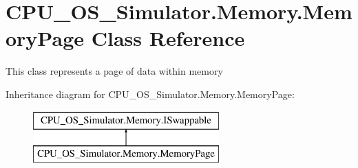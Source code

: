 \hypertarget{class_c_p_u___o_s___simulator_1_1_memory_1_1_memory_page}{}\section{C\+P\+U\+\_\+\+O\+S\+\_\+\+Simulator.\+Memory.\+Memory\+Page Class Reference}
\label{class_c_p_u___o_s___simulator_1_1_memory_1_1_memory_page}


This class represents a page of data within memory  


Inheritance diagram for C\+P\+U\+\_\+\+O\+S\+\_\+\+Simulator.\+Memory.\+Memory\+Page\+:\begin{figure}[H]
\begin{center}
\leavevmode
\includegraphics[height=2.000000cm]{class_c_p_u___o_s___simulator_1_1_memory_1_1_memory_page}
\end{center}
\end{figure}
